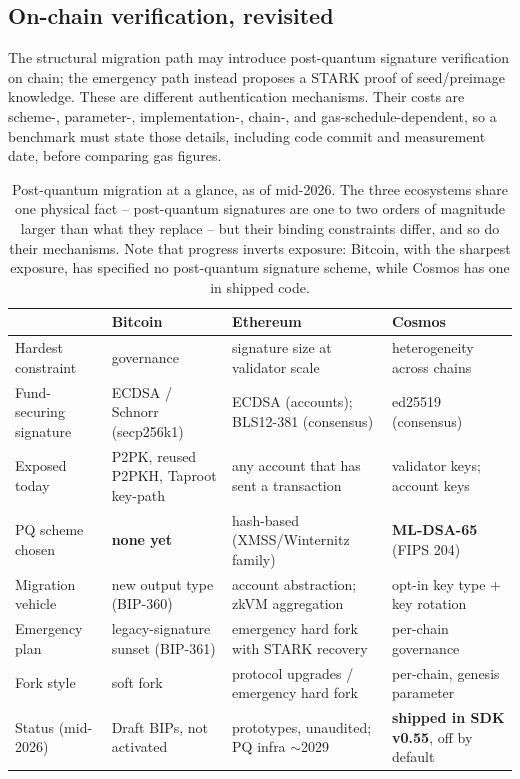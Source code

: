 \subsection{On-chain verification, revisited}
The structural migration path may introduce post-quantum signature verification on
chain; the emergency path instead proposes a STARK proof of seed/preimage knowledge.
These are different authentication mechanisms. Their costs are scheme-, parameter-,
implementation-, chain-, and gas-schedule-dependent, so a benchmark must state those
details, including code commit and measurement date, before comparing gas figures.

\begin{table}[H]
\centering
\small
\begin{tabular}{@{}p{2.5cm}p{3.6cm}p{4.0cm}p{4.0cm}@{}}
\toprule
 & \textbf{Bitcoin} & \textbf{Ethereum} & \textbf{Cosmos} \\
\midrule
Hardest constraint & governance & signature size at validator scale & heterogeneity across chains \\
Fund-securing signature & ECDSA / Schnorr (secp256k1) & ECDSA (accounts); BLS12-381 (consensus) & ed25519 (consensus) \\
Exposed today & P2PK, reused P2PKH, Taproot key-path & any account that has sent a transaction & validator keys; account keys \\
PQ scheme chosen & \textbf{none yet} & hash-based (XMSS/Winternitz family) & \textbf{ML-DSA-65} (FIPS 204) \\
Migration vehicle & new output type (BIP-360) & account abstraction; zkVM aggregation & opt-in key type $+$ key rotation \\
Emergency plan & legacy-signature sunset (BIP-361) & emergency hard fork with STARK recovery & per-chain governance \\
Fork style & soft fork & protocol upgrades / emergency hard fork & per-chain, genesis parameter \\
Status (mid-2026) & Draft BIPs, not activated & prototypes, unaudited; PQ infra $\sim$2029 & \textbf{shipped in SDK v0.55}, off by default \\
\bottomrule
\end{tabular}
\caption{Post-quantum migration at a glance, as of mid-2026. The three ecosystems share one physical fact -- post-quantum signatures are one to two orders of magnitude larger than what they replace -- but their binding constraints differ, and so do their mechanisms. Note that progress inverts exposure: Bitcoin, with the sharpest exposure, has specified no post-quantum signature scheme, while Cosmos has one in shipped code.}
\label{tab:chain-migration}
\end{table}


